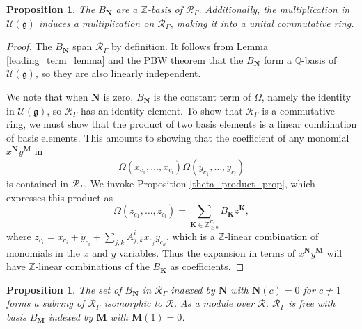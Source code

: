 \documentclass[10pt]{article}
\newtheorem{proposition}[theorem]{Proposition}
\theoremstyle{definition}
\newcommand{\RGamma}{\mathcal{R}_{\Gamma}}
\begin{document}
\begin{proposition} \label{r_gamma_is_an_algebra_prop}
The $B_{\mathbf{N}}$ are a $\mathbb{Z}$-basis of $\RGamma$. Additionally, the multiplication in $\mathcal{U}(\mathfrak{g})$ induces a multiplication on $\RGamma$, making it into a unital commutative ring.
\end{proposition}
\begin{proof}
The $B_{\mathbf{N}}$ span $\RGamma$ by definition. It follows from Lemma \ref{leading_term_lemma} and the PBW theorem that the $B_{\mathbf{N}}$ form a $\mathbb{Q}$-basis of $\mathcal{U}(\mathfrak{g})$, so they are also linearly independent.

We note that when $\mathbf{N}$ is zero, $B_{\mathbf{N}}$ is the constant term of $\Omega$, namely the identity in $\mathcal{U}(\mathfrak{g})$, so $\RGamma$ has an identity element. To show that $\RGamma$ is a commutative ring, we must show that the product of two basis elements is a linear combination of basis elements. This amounts to showing that the coefficient of any monomial $x^{\mathbf{N}} y^{\mathbf{M}}$ in 
\[
\Omega(x_{c_1}, \ldots, x_{c_l}) \Omega(y_{c_1}, \ldots, y_{c_l})
\]
is contained in $\RGamma$. We invoke Proposition \ref{theta_product_prop}, which expresses this product as 
\[
\Omega(z_{c_1}, \ldots, z_{c_l}) = \sum_{\mathbf{K} \in \mathbb{Z}_{\geq 0}^{\Gamma_*}} B_{\mathbf{K}} z^{\mathbf{K}},
\]
where $z_{c_i} = x_{c_i} + y_{c_i} + \sum_{j,k}A_{j, k}^{i}x_{c_j} y_{c_k}$, which is a $\mathbb{Z}$-linear combination of monomials in the $x$ and $y$ variables. Thus the expansion in terms of $x^{\mathbf{N}} y^{\mathbf{M}}$ will have $\mathbb{Z}$-linear combinations of the $B_{\mathbf{K}}$ as coefficients.
\end{proof}

\begin{proposition} \label{rgamma_free_over_r_prop}
The set of $B_{\mathbf{N}}$ in $\RGamma$ indexed by $\mathbf{N}$ with $\mathbf{N}(c) = 0$ for $c \neq 1$ forms a subring of $\RGamma$ isomorphic to $\mathcal{R}$. As a module over $\mathcal{R}$, $\RGamma$ is free with basis $B_{\mathbf{M}}$ indexed by $\mathbf{M}$ with $\mathbf{M}(1) = 0$.
\end{proposition}
\end{document}
